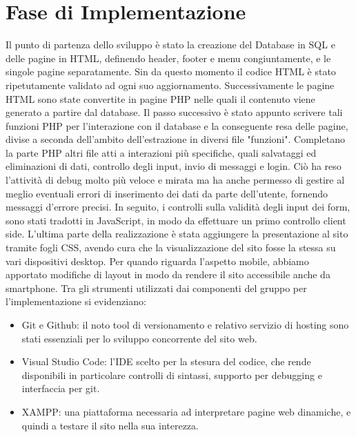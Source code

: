 \section{Fase di Implementazione}

Il punto di partenza dello sviluppo è stato la creazione del Database in SQL e delle pagine in HTML, definendo header, footer e menu congiuntamente, e le singole pagine separatamente. Sin da questo momento il codice HTML è stato ripetutamente validato ad ogni suo aggiornamento. Successivamente le pagine HTML sono state convertite in pagine PHP nelle quali il contenuto viene generato a partire dal database.
Il passo successivo è stato appunto scrivere tali funzioni PHP per l’interazione con il database e la conseguente resa delle pagine, divise a seconda dell'ambito dell'estrazione in diversi file "funzioni". Completano la parte PHP altri file atti a interazioni più specifiche, quali salvataggi ed eliminazioni di dati, controllo degli input, invio di messaggi e login.
Ciò ha reso l’attività di debug molto più veloce e mirata ma ha anche permesso di gestire al meglio eventuali errori di inserimento dei dati da parte dell’utente, fornendo messaggi d’errore precisi. In seguito, i controlli sulla validità degli input dei form, sono stati tradotti in JavaScript, in modo da effettuare un primo controllo client side.
L’ultima parte della realizzazione è stata aggiungere la presentazione al sito tramite fogli CSS, avendo cura che la visualizzazione del sito fosse la stessa su vari dispositivi desktop. Per quando riguarda l’aspetto mobile, abbiamo apportato modifiche di layout in modo da rendere il sito accessibile anche da smartphone.
Tra gli strumenti utilizzati dai componenti del gruppo per l'implementazione si evidenziano:
\begin{itemize}
    \item Git e Github: il noto tool di versionamento e relativo servizio di hosting sono stati essenziali per lo sviluppo concorrente del sito web.
    \item Visual Studio Code: l'IDE scelto per la stesura del codice, che rende disponibili in particolare controlli di sintassi, supporto per debugging e interfaccia per git.
    \item XAMPP: una piattaforma necessaria ad interpretare pagine web dinamiche, e quindi a testare il sito nella sua interezza.
\end{itemize}
\pagebreak
